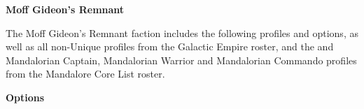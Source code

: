 \documentclass{article}
\begin{document}
\vspace{0.6cm}

{\Large \textbf{Moff Gideon's Remnant}}
\vspace{0.3cm}

\begin{minipage}{19cm}
    The Moff Gideon's Remnant faction includes the following profiles and options,
    as well as all non-Unique profiles from the Galactic Empire roster,
    and the and Mandalorian Captain, Mandalorian Warrior and Mandalorian Commando
    profiles from the Mandalore Core List roster.
\end{minipage}

\vspace{0.3cm}
{\scriptsize
\setlength\extrarowheight{1.5pt}

}
\vspace{0.6cm}

{\large \textbf{Options}}
\vspace{0.3cm}
\begin{multicols}{2}
    {\scriptsize

    \setlength\extrarowheight{1.5pt}
    

    \vspace{0.6cm}

    \setlength\extrarowheight{1.5pt}
    

    \vspace{0.6cm}

    \setlength\extrarowheight{1.5pt}
    

    \vspace{0.6cm}

    \setlength\extrarowheight{1.5pt}
    

    \vspace{0.6cm}

    \setlength\extrarowheight{1.5pt}
    

    }
\end{multicols}
\end{document}
